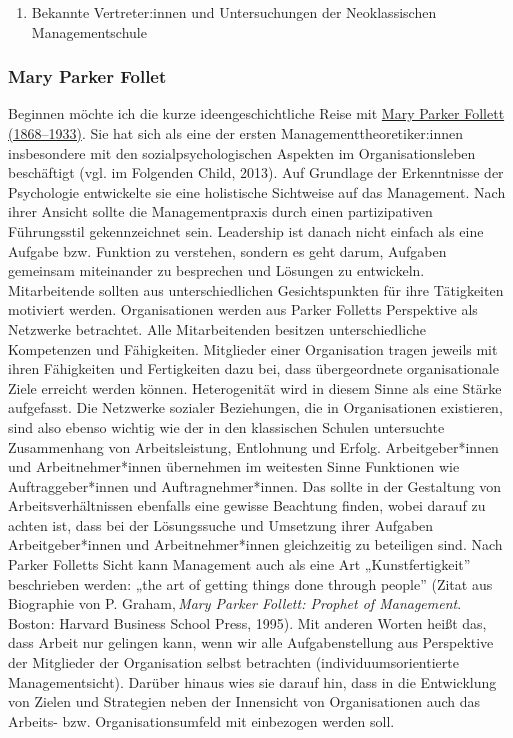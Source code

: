 \documentclass[
  letterpaper,
]{book}
\providecommand{\tightlist}{%
  \setlength{\itemsep}{0pt}\setlength{\parskip}{0pt}}
\begin{document}
\begin{enumerate}
\def\labelenumi{\arabic{enumi}.}
\setcounter{enumi}{1}
\tightlist
\item
  Bekannte Vertreter:innen und Untersuchungen der Neoklassischen
  Managementschule
\end{enumerate}

\subsubsection{Mary Parker Follet}\label{mary-parker-follet}

Beginnen möchte ich die kurze ideengeschichtliche Reise mit
\href{https://en.wikipedia.org/wiki/Mary_Parker_Follett}{Mary Parker
Follett (1868--1933)}. Sie hat sich als eine der ersten
Managementtheoretiker:innen insbesondere mit den sozialpsychologischen
Aspekten im Organisationsleben beschäftigt (vgl. im Folgenden Child,
2013). Auf Grundlage der Erkenntnisse der Psychologie entwickelte sie
eine holistische Sichtweise auf das Management. Nach ihrer Ansicht
sollte die Managementpraxis durch einen partizipativen Führungsstil
gekennzeichnet sein. Leadership ist danach nicht einfach als eine
Aufgabe bzw. Funktion zu verstehen, sondern es geht darum, Aufgaben
gemeinsam miteinander zu besprechen und Lösungen zu entwickeln.
Mitarbeitende sollten aus unterschiedlichen Gesichtspunkten für ihre
Tätigkeiten motiviert werden. Organisationen werden aus Parker Folletts
Perspektive als Netzwerke betrachtet. Alle Mitarbeitenden besitzen
unterschiedliche Kompetenzen und Fähigkeiten. Mitglieder einer
Organisation tragen jeweils mit ihren Fähigkeiten und Fertigkeiten dazu
bei, dass übergeordnete organisationale Ziele erreicht werden können.
Heterogenität wird in diesem Sinne als eine Stärke aufgefasst. Die
Netzwerke sozialer Beziehungen, die in Organisationen existieren, sind
also ebenso wichtig wie der in den klassischen Schulen untersuchte
Zusammenhang von Arbeitsleistung, Entlohnung und Erfolg.
Arbeitgeber*innen und Arbeitnehmer*innen übernehmen im weitesten Sinne
Funktionen wie Auftraggeber*innen und Auftragnehmer*innen. Das sollte in
der Gestaltung von Arbeitsverhältnissen ebenfalls eine gewisse Beachtung
finden, wobei darauf zu achten ist, dass bei der Lösungssuche und
Umsetzung ihrer Aufgaben Arbeitgeber*innen und Arbeitnehmer*innen
gleichzeitig zu beteiligen sind. Nach Parker Folletts Sicht kann
Management auch als eine Art „Kunstfertigkeit'' beschrieben werden: „the
art of getting things done through people'' (Zitat aus Biographie von P.
Graham,\,\emph{Mary Parker Follett: Prophet of Management}. Boston:
Harvard Business School Press, 1995). Mit anderen Worten heißt das, dass
Arbeit nur gelingen kann, wenn wir alle Aufgabenstellung aus Perspektive
der Mitglieder der Organisation selbst betrachten
(individuumsorientierte Managementsicht). Darüber hinaus wies sie darauf
hin, dass in die Entwicklung von Zielen und Strategien neben der
Innensicht von Organisationen auch das Arbeits- bzw. Organisationsumfeld
mit einbezogen werden soll.
\end{document}
